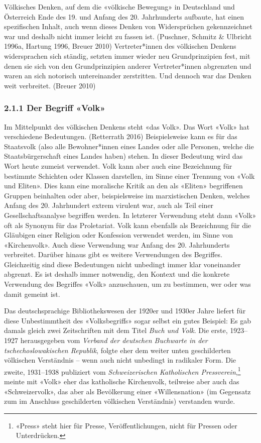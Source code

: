 \documentclass[a4paper,
fontsize=11pt,
oneside,
numbers=noperiodatend,
parskip=half-,
bibliography=totoc,
final
]{scrartcl}
\begin{document}
Völkisches Denken, auf dem die «völkische Bewegung» in Deutschland und
Österreich Ende des 19. und Anfang des 20. Jahrhunderts aufbaute, hat
einen spezifischen Inhalt, auch wenn dieses Denken von Widersprüchen
gekennzeichnet war und deshalb nicht immer leicht zu fassen ist.
(Puschner, Schmitz \& Ulbricht 1996a, Hartung 1996, Breuer 2010)
Vertreter*innen des völkischen Denkens widersprachen sich ständig,
setzten immer wieder neu Grundprinzipien fest, mit denen sie sich von
den Grundprinzipien anderer Vertreter*innen abgrenzten und waren an sich
notorisch untereinander zerstritten. Und dennoch war das Denken weit
verbreitet. (Breuer 2010)

\hypertarget{der-begriff-volk}{%
\subsubsection{2.1.1 Der Begriff «Volk»}\label{der-begriff-volk}}

Im Mittelpunkt des völkischen Denkens steht «das Volk». Das Wort «Volk»
hat verschiedene Bedeutungen. (Retterrath 2016) Beispielsweise kann es
für das Staatsvolk (also alle Bewohner*innen eines Landes oder alle
Personen, welche die Staatsbürgerschaft eines Landes haben) stehen. In
dieser Bedeutung wird das Wort heute zumeist verwendet. Volk kann aber
auch eine Bezeichnung für bestimmte Schichten oder Klassen darstellen,
im Sinne einer Trennung von «Volk und Eliten». Dies kann eine moralische
Kritik an den als «Eliten» begriffenen Gruppen beinhalten oder aber,
beispielsweise im marxistischen Denken, welches Anfang des 20.
Jahrhundert extrem virulent war, auch als Teil einer
Gesellschaftsanalyse begriffen werden. In letzterer Verwendung steht
dann «Volk» oft als Synonym für das Proletariat. Volk kann ebenfalls als
Bezeichnung für die Gläubigen einer Religion oder Konfession verwendet
werden, im Sinne von «Kirchenvolk». Auch diese Verwendung war Anfang des
20. Jahrhunderts verbreitet. Darüber hinaus gibt es weitere Verwendungen
des Begriffes. Gleichzeitig sind diese Bedeutungen nicht unbedingt immer
klar voneinander abgrenzt. Es ist deshalb immer notwendig, den Kontext
und die konkrete Verwendung des Begriffes «Volk» anzuschauen, um zu
bestimmen, wer oder was damit gemeint ist.

Das deutschsprachige Bibliothekswesen der 1920er und 1930er Jahre
liefert für diese Unbestimmtheit des «Volksbegriffs» sogar selbst ein
gutes Beispiel: Es gab damals gleich zwei Zeitschriften mit dem Titel
\emph{Buch und Volk}. Die erste, 1923--1927 herausgegeben vom
\emph{Verband der deutschen Buchwarte in der tschechoslowakischen
Republik}, folgte eher dem weiter unten geschilderten völkischen
Verständnis -- wenn auch nicht unbedingt in radikaler Form. Die zweite,
1931--1938 publiziert vom \emph{Schweizerischen Katholischen
Pressverein},\footnote{«Press» steht hier für Presse,
  Veröffentlichungen, nicht für Pressen oder Unterdrücken.} meinte mit
«Volk» eher das katholische Kirchenvolk, teilweise aber auch das
«Schweizervolk», das aber als Bevölkerung einer «Willensnation» (im
Gegensatz zum im Anschluss geschilderten völkischen Verständnis)
verstanden wurde.
\end{document}
